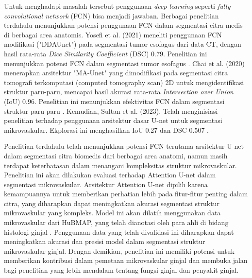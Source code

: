 \noindent Untuk menghadapi masalah tersebut penggunaan \textit{deep learning} seperti \textit{fully convolutional network }(FCN) bisa menjadi jawaban. Berbagai penelitian terdahulu menunjukkan potensi penggunaan FCN dalam segmentasi citra medis di berbagai area anatomis. Yosefi et al. (2021) meneliti penggunaan FCN modifikasi ("DDAUnet") pada segmentasi tumor esofagus dari data CT, dengan hasil rata-rata \textit{Dice Similarity Coefficient} (DSC) 0.79. Penelitian ini menunjukkan potensi FCN dalam segmentasi tumor esofagus \cite{yousefi_esophageal_2021}. Chai et al. (2020) menerapkan arsitektur "MA-Unet" yang dimodifikasi pada segmentasi citra tomografi terkomputasi (computed tomography scan) 2D untuk mengidentifikasi struktur paru-paru, mencapai hasil akurasi rata-rata \textit{Intersection over Union} (IoU) 0.96. Penelitian ini menunjukkan efektivitas FCN dalam segmentasi struktur paru-paru \cite{cai_ma-unet_2020}.
Kemudian, Sultan et al. (2023). Telah menginisiasi penelitian terhadap penggunaan arsitektur dasar U-net untuk segmentasi mikrovaskular. Ekplorasi ini menghasilkan IoU 0.27 dan DSC 0.507 \cite{sultan_microvasculature_2023}.


\noindent Penelitian terdahulu telah menunjukkan potensi FCN terutama arsitektur U-net dalam segmentasi citra biomedis dari berbagai area anatomi, namun masih terdapat keterbatasan dalam menangani kompleksitas struktur mikrovaskular. Penelitian ini akan dilakukan evaluasi terhadap Attention U-net dalam segmentasi mikrovaskular. Arsitektur Attention U-net dipilih karena kemampuannya untuk memberikan perhatian lebih pada fitur-fitur penting dalam citra, yang diharapkan dapat meningkatkan akurasi segmentasi struktur mikrovaskular yang kompleks. Model ini akan dilatih menggunakan data mikrovaskular dari HuBMAP, yang telah dianotasi oleh para ahli di bidang histologi ginjal \cite{howard_hubmap_2023}. Penggunaan data yang telah divalidasi ini diharapkan dapat meningkatkan akurasi dan presisi model dalam segmentasi struktur mikrovaskular ginjal. Dengan demikian, penelitian ini memiliki potensi untuk memberikan kontribusi dalam pemetaan mikrovaskular ginjal dan membuka jalan bagi penelitian yang lebih mendalam tentang fungsi ginjal dan penyakit ginjal. 

